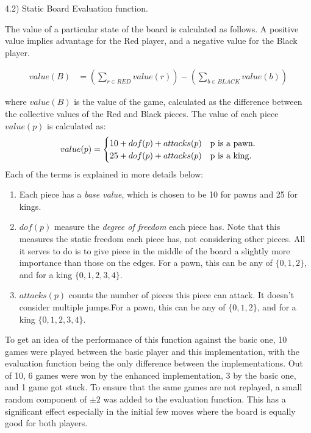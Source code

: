 \documentclass[11pt]{article}
\begin{document}


\newpage

4.2) Static Board Evaluation function.

The value of a particular state of the board is calculated as follows. A positive
value implies advantage for the Red player, and a negative value for the Black player.

\begin{align*}
	value(B) &= (\sum_{r \in RED} value(r)) - (\sum_{b \in BLACK} value(b))
\end{align*}

where $value(B)$ is the value of the game, calculated as the difference between the collective
values of the Red and Black pieces. The value of each piece $value(p)$ is calculated as:
\begin{align*}
	value(p) = \begin{cases}
							10 + dof(p) + attacks(p) & \text{p is a pawn.}
							\cr
							25 + dof(p) + attacks(p) & \text{p is a king.}
						 \end{cases}
\end{align*}
Each of the terms is explained in more details below:
\begin{enumerate}
	\item Each piece has a \emph{base value}, which is chosen
		to be 10 for pawns and 25 for kings.
	\item $dof(p)$ measure the \emph{degree of freedom} each piece has. Note that
	  this measures the static freedom each piece has, not considering other pieces.
	  All it serves to do is to give piece in the middle of the board a slightly more
	  importance than those on the edges. For a pawn, this can be any of $\{0,1,2\}$, and
	  for a king $\{0,1,2,3,4\}$.
	\item $attacks(p)$ counts the number of pieces this piece can attack. It doesn't
		consider multiple jumps.For a pawn, this can be any of $\{0,1,2\}$, and
	  for a king $\{0,1,2,3,4\}$.
\end{enumerate}

To get an idea of the performance of this function against the basic one, 10 games were
played between the basic player and this implementation, with the evaluation function being
the only difference between the implementations. Out of 10, 6 games were won by the 
enhanced implementation, 3 by the basic one, and 1 game got stuck. To ensure that the
same games are not replayed, a small random component of $\pm 2$ was added to the 
evaluation function. This has a significant effect especially in the initial few moves
where the board is equally good for both players.
\end{document}
